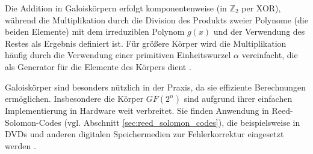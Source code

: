 Die Addition in Galoiskörpern erfolgt komponentenweise (in $\mathbb{Z}_2$ per XOR), während die Multiplikation durch die Division des Produkts zweier Polynome (die beiden Elemente) mit dem irreduziblen Polynom \(g(x)\) und der Verwendung des Restes als Ergebnis definiert ist. Für größere Körper wird die Multiplikation häufig durch die Verwendung einer primitiven Einheitswurzel \(\alpha\) vereinfacht, die als Generator für die Elemente des Körpers dient \cite{Springer_RS}.

Galoiskörper sind besonders nützlich in der Praxis, da sie effiziente Berechnungen ermöglichen. Insbesondere die Körper \(GF(2^n)\) sind aufgrund ihrer einfachen Implementierung in Hardware weit verbreitet. Sie finden Anwendung in Reed-Solomon-Codes (vgl. Abschnitt \ref{sec:reed_solomon_codes}), die beispielsweise in DVDs und anderen digitalen Speichermedien zur Fehlerkorrektur eingesetzt werden \cite{Springer_RS}.

